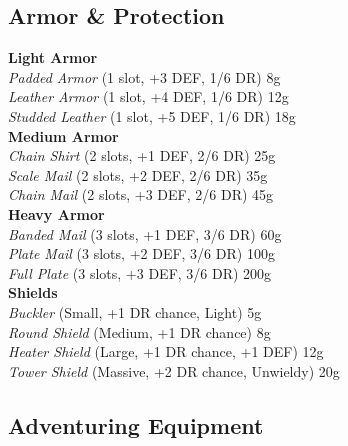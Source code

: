 \documentclass[10pt,twoside]{article}
\begin{document}
\subsection{Armor \& Protection}

\begin{multicols}{2}
\textbf{Light Armor} \\
\textit{Padded Armor} (1 slot, +3 DEF, 1/6 DR) \dotfill 8g \\
\textit{Leather Armor} (1 slot, +4 DEF, 1/6 DR) \dotfill 12g \\
\textit{Studded Leather} (1 slot, +5 DEF, 1/6 DR) \dotfill 18g \\

\textbf{Medium Armor} \\
\textit{Chain Shirt} (2 slots, +1 DEF, 2/6 DR) \dotfill 25g \\
\textit{Scale Mail} (2 slots, +2 DEF, 2/6 DR) \dotfill 35g \\
\textit{Chain Mail} (2 slots, +3 DEF, 2/6 DR) \dotfill 45g \\

\textbf{Heavy Armor} \\
\textit{Banded Mail} (3 slots, +1 DEF, 3/6 DR) \dotfill 60g \\
\textit{Plate Mail} (3 slots, +2 DEF, 3/6 DR) \dotfill 100g \\
\textit{Full Plate} (3 slots, +3 DEF, 3/6 DR) \dotfill 200g \\

\textbf{Shields} \\
\textit{Buckler} (Small, +1 DR chance, Light) \dotfill 5g \\
\textit{Round Shield} (Medium, +1 DR chance) \dotfill 8g \\
\textit{Heater Shield} (Large, +1 DR chance, +1 DEF) \dotfill 12g \\
\textit{Tower Shield} (Massive, +2 DR chance, Unwieldy) \dotfill 20g \\
\end{multicols}

\subsection{Adventuring Equipment}
\end{document}
